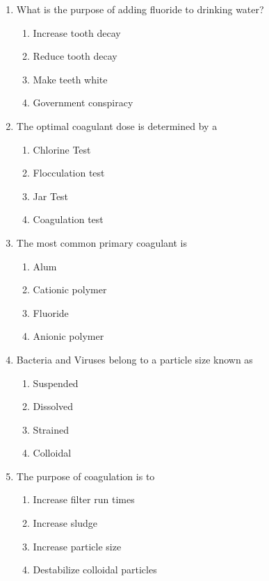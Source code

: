 \begin{enumerate}
\item What is the purpose of adding fluoride to drinking water?
\begin{enumerate}
\item Increase tooth decay
\item Reduce tooth decay
\item Make teeth white
\item Government conspiracy
\end{enumerate}

\item The optimal coagulant dose is determined by a\\
\begin{enumerate}
\item Chlorine Test\\
\item Flocculation test\\
\item Jar Test\\
\item Coagulation test
\end{enumerate}

\item  The most common primary coagulant is\\
\begin{enumerate}
\item Alum\\
\item Cationic polymer\\
\item Fluoride\\
\item Anionic polymer
\end{enumerate}

\item  Bacteria and Viruses belong to a particle size known as\\
\begin{enumerate}
\item Suspended\\
\item Dissolved\\
\item Strained\\
\item Colloidal
\end{enumerate}

\item  The purpose of coagulation is to\\
\begin{enumerate}
\item Increase filter run times\\
\item Increase sludge\\
\item Increase particle size\\
\item Destabilize colloidal particles
\end{enumerate}


\end{enumerate}
